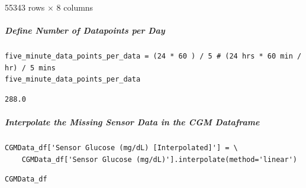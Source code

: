 \bigskip

55343 rows $\times$ 8 columns

\subparagraph{Define Number of Datapoints per Day}

\begin{verbatim}
five_minute_data_points_per_data = (24 * 60 ) / 5 # (24 hrs * 60 min / hr) / 5 mins 
five_minute_data_points_per_data
\end{verbatim}

\begin{verbatim}
288.0
\end{verbatim}

\subparagraph{Interpolate the Missing Sensor Data in the CGM Dataframe}

\begin{verbatim}
CGMData_df['Sensor Glucose (mg/dL) [Interpolated]'] = \
    CGMData_df['Sensor Glucose (mg/dL)'].interpolate(method='linear')
\end{verbatim}

\begin{verbatim}
CGMData_df
\end{verbatim}

